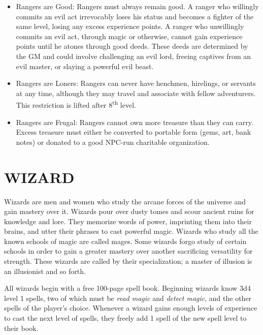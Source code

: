 \begin{multicols}{2}
\begin{itemize}

\item Rangers are Good: Rangers must always remain good.  A ranger who willingly commits an evil act irrevocably loses his status and becomes a fighter of the same level, losing any excess experience points.  A ranger who unwillingly commits an evil act, through magic or otherwise, cannot gain experience points until he atones through good deeds.  These deeds are determined by the GM and could involve challenging an evil lord, freeing captives from an evil master, or slaying a powerful evil beast.  

\item Rangers are Loners: Rangers can never have henchmen, hirelings, or servants at any time, although they may travel and associate with fellow adventurers.  This restriction is lifted after 8\textsuperscript{th} level.  

\item Rangers are Frugal: Rangers cannot own more treasure than they can carry.  Excess treasure must either be converted to portable form (gems, art, bank notes) or donated to a good NPC-run charitable organization.  

\end{itemize}
 
\section{WIZARD}

Wizards are men and women who study the arcane forces of the universe and gain mastery over it.  Wizards pour over dusty tomes and scour ancient ruins for knowledge and lore.  They memorize words of power, imprinting them into their brains, and utter their phrases to cast powerful magic.  Wizards who study all the known schools of magic are called mages.  Some wizards forgo study of certain schools in order to gain a greater mastery over another sacrificing versatility for strength.  These wizards are called by their specialization; a master of illusion is an illusionist and so forth.

All wizards begin with a free 100-page spell book.  Beginning wizards know 3d4 level 1 spells, two of which must be \textit{read magic} and \textit{detect magic}, and the other spells of the player's choice.  Whenever a wizard gains enough levels of experience to cast the next level of spells, they freely add 1 spell of the new spell level to their book.


\end{multicols}
